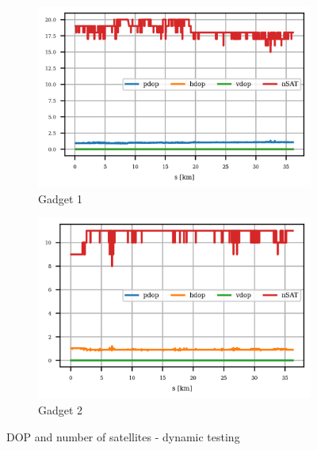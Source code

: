 \documentclass{article}
\begin{document}
			\begin{figure}[h]
		   		\centering
		     	\begin{subfigure}[b]{0.45\textwidth}
		      		\centering
		      	   \includegraphics[width=\textwidth]{Dynamic/cond_dop_U-blox M8N.png}
		      	   \caption{Gadget 1}
		      	   \label{fig:iPhone_raw_dop}
		     	\end{subfigure}
		     	\begin{subfigure}[b]{0.45\textwidth}
		      	   \centering
		      	   \includegraphics[width=\textwidth]{Dynamic/cond_dop_MTK 3339.png}
		      	   \caption{Gadget 2}
		      	   \label{fig:iPhone_cond_dop}
		     	\end{subfigure}
		      \caption{DOP and number of satellites - dynamic testing}
		      \label{fig:iPhone_dop}
			\end{figure}
\end{document}
